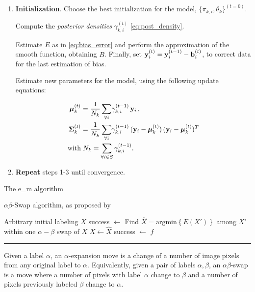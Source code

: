 \begin{algorithm}[h]
\begin{enumerate}
\item[] \textbf{Initialization}.
Choose the best initialization for the model,
  $\lbrace \pi_{k,i}, \theta_k \rbrace^{(t=0)}$.
 
Compute the \emph{posterior densities} $\gamma_{k,i}^{(t)}$ \eqref{eq:post_density}.
 
Estimate $E$ as in \eqref{eq:bias_error} and perform the approximation
  of the smooth function, obtaining $B$.
Finally, set $\mathbf{y}_i^{(t)} = \mathbf{y}_i^{(t-1)} - \mathbf{b}_i^{(t)}$, to correct data for
  the last estimation of bias.
 
  Estimate new parameters for the model, using the following update equations:
  
  \begin{equation*}
  \begin{aligned}
  \label{eq:m_step}
  \boldsymbol{\mu}_{k}^{(t)}&=\frac{1}{N_k} \, \underset{\forall i}\sum \gamma_{k,i}^{(t-1)} \, \mathbf{y}_{i}\,, \\
  \boldsymbol{\Sigma}_{k}^{(t)}&=\frac{1}{N_k} \, \underset{\forall i}\sum \gamma_{k,i}^{(t-1)} \, (\mathbf{y}_{i}-\boldsymbol{\mu}_{k}^{(t)})\,(\mathbf{y}_{i}-\boldsymbol{\mu}_{k}^{(t)})^{T} \\
  \textrm{with} &\; N_k = \sum_{\forall i \in S} \gamma_{k,i}^{(t-1)}.
  \end{aligned}
  \end{equation*}

\item[] \textbf{Repeat} steps 1-3 until convergence.
\end{enumerate}
\caption{The \gls*{e_m} algorithm}\label{alg:e_m}
\end{algorithm}

\begin{algorithm}
\caption{$\alpha\beta$-Swap algorithm, as proposed by \cite{boykov_fast_2001}}
\label{alg:swap}
\begin{minipage}{\textwidth}
\begin{algorithmic}[1]
	\REQUIRE Arbitrary initial labeling $X$
	\STATE success $\leftarrow$ \FALSE
			\STATE Find $\hat{X}= \textrm{argmin} \left\lbrace E(X') \right\rbrace $ among $X'$ within one $\alpha-\beta$ swap of $X$
				\STATE $X \leftarrow \hat{X}$
			\ELSE
				\STATE success $\leftarrow$ \TRUE
			\ENDIF
		\ENDFOR
	\ENDWHILE
	\RETURN $f$
\end{algorithmic}
\noindent \rule{\textwidth}{0.4pt}

\footnotesize
\noindent
Given a label $\alpha$, an $\alpha$-expansion move is a change of a number
  of image pixels from any original label to $\alpha$.
Equivalently, given a pair of labels $\alpha,\beta$, an
  $\alpha\beta$-swap is a move where a number of pixels 
  with label $\alpha$ change to $\beta$ and 
  a number of pixels previously labeled $\beta$ change to $\alpha$.
\end{minipage}
\end{algorithm}